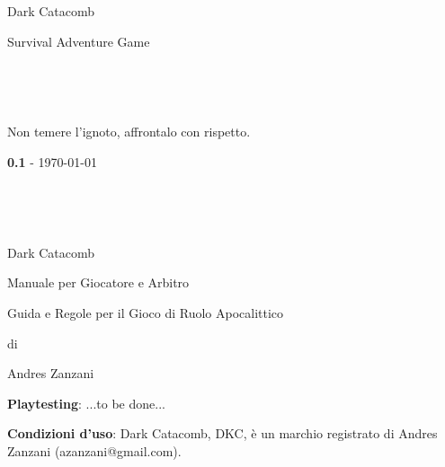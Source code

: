 \documentclass[12pt,a4paper,twoside,openany]{book}
\begin{document}
	
\def \versione {0.1}
\thispagestyle{empty}
 
{\Huge \begin{center}
		Dark Catacomb
\end{center}}

\vfill
\begin{center}
	\Large{\color{black} Survival Adventure Game}
\end{center}

\newpage~\thispagestyle{empty}%

\newpage~\thispagestyle{empty}%
	
\bigskip
Non temere l'ignoto, affrontalo con rispetto.
	
	\vspace{\fill}
\begin{center}\textbf{\versione} - \today\end{center}
\thispagestyle{empty}

\newpage~\thispagestyle{empty}%

\newpage~\thispagestyle{empty}%


\newcommand{\riga}{\rule{\textwidth}{0.4pt}}


{\Huge \begin{center} Dark Catacomb\end{center}}

\bigskip

\begin{center}{\LARGE Manuale per Giocatore e Arbitro}\\ \end{center}

{\large \begin{center} Guida e Regole per il Gioco di Ruolo Apocalittico \end{center}}

\begin{center}di \end{center}

{\LARGE \begin{center} Andres Zanzani \end{center}}

\vspace{2cm}


\vfill

\begin{mdframed}[roundcorner=10pt]

\medskip

\textbf{Playtesting}: ...to be done...

\bigskip

\begin{flushleft}\textbf{Condizioni d'uso}: Dark Catacomb, DKC, è un marchio registrato di Andres Zanzani (azanzani@gmail.com).
\end{flushleft}

\vspace{0.5cm}


\medskip

\end{mdframed}
\end{document}
